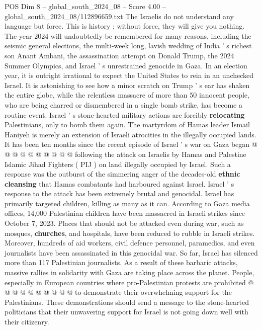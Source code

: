 \begin{textsample}{POS Dim 8 – global\_south\_2024\_08 – Score 4.00 – global\_south\_2024\_08/112896659.txt}  \label{ex:f8_pos_374}
The Israelis do not understand any language but force.
This is history ; without force, they will give you nothing.
The year 2024 will undoubtedly be remembered for many reasons, including the seismic general elections, the multi-week long, lavish wedding of India ' s richest son Anant Ambani, the assassination attempt on Donald Trump, the 2024 Summer Olympics, and Israel ' s unrestrained genocide in Gaza.
In an election year, it is outright irrational to expect the United States to rein in an unchecked Israel.
It is astonishing to see how a minor scratch on Trump ' s ear has shaken the entire globe, while the relentless massacre of more than 50 innocent people, who are being charred or dismembered in a single bomb strike, has become a routine event.
Israel ' s stone-hearted military actions are forcibly \textbf{relocating} Palestinians, only to bomb them again.
The martyrdom of Hamas leader Ismail Haniyeh is merely an extension of Israeli atrocities in the illegally occupied lands.
It has been ten months since the recent episode of Israel ' s war on Gaza began @ @ @ @ @ @ @ @ @ @ following the attack on Israelis by Hamas and Palestine Islamic Jihad Fighters ( PIJ ) on land illegally occupied by Israel.
Such a response was the outburst of the simmering anger of the decades-old \textbf{ethnic} \textbf{cleansing} that Hamas combatants had harboured against Israel.
Israel ' s response to the attack has been extremely brutal and genocidal.
Israel has primarily targeted children, killing as many as it can.
According to Gaza media offices, 14,000 Palestinian children have been massacred in Israeli strikes since October 7, 2023.
Places that should not be attacked even during war, such as mosques, \textbf{churches}, and hospitals, have been reduced to rubble in Israeli strikes.
Moreover, hundreds of aid workers, civil defence personnel, paramedics, and even journalists have been assassinated in this genocidal war.
So far, Israel has silenced more than 117 Palestinian journalists.
As a result of these barbaric attacks, massive rallies in solidarity with Gaza are taking place across the planet.
People, especially in European countries where pro-Palestinian protests are prohibited @ @ @ @ @ @ @ @ @ @ to demonstrate their overwhelming support for the Palestinians.
These demonstrations should send a message to the stone-hearted politicians that their unwavering support for Israel is not going down well with their citizenry.

\end{textsample}
